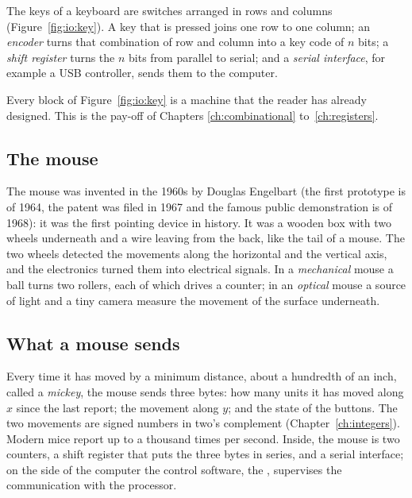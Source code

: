 The keys of a keyboard are switches arranged in rows and columns
(Figure~\ref{fig:io:key}). A key that is pressed joins one row to one column;
an \emph{encoder} turns that combination of row and column into a key code of
$n$ bits; a \emph{shift register} turns the $n$ bits from parallel to serial;
and a \emph{serial interface}, for example a USB controller, sends them to
the computer.

\begin{prgconcept}
Every block of Figure~\ref{fig:io:key} is a machine that the reader has
already designed. This is the pay-off of Chapters \ref{ch:combinational}
to~\ref{ch:registers}.
\end{prgconcept}

\subsection{The mouse}

The mouse was invented in the 1960s by Douglas Engelbart (the first prototype
is of 1964, the patent was filed in 1967 and the famous public demonstration
is of 1968): it was the first pointing device in history. It was a wooden box
with two wheels underneath and a wire leaving from the back, like the tail of
a mouse. The two wheels detected the movements along the horizontal and the
vertical axis, and the electronics turned them into electrical signals. In a
\emph{mechanical} mouse a ball turns two rollers, each of which drives a
counter; in an \emph{optical} mouse a source of light and a tiny camera
measure the movement of the surface underneath.

\subsection{What a mouse sends}

Every time it has moved by a minimum distance, about a hundredth of an inch,
called a \emph{mickey}, the mouse sends three bytes: how many units it has
moved along $x$ since the last report; the movement along $y$; and the state
of the buttons. The two movements are signed numbers in two's complement
(Chapter~\ref{ch:integers}). Modern mice report up to a thousand times per
second. Inside, the mouse is two counters, a shift register that puts the
three bytes in series, and a serial interface; on the side of the computer
the control software, the , supervises the communication
with the processor.

